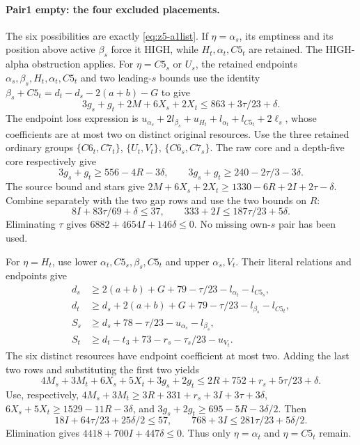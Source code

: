 \documentclass[11pt,letterpaper]{article}
\theoremstyle{definition}\newtheorem{definition}[theorem]{Definition}
\begin{document}
\paragraph{Pair1 empty: the four excluded placements.}
The six possibilities are exactly \eqref{eq:z5-a1list}.
If $\eta=\alpha_s$, its emptiness and its position above active
$\beta_s$ force it HIGH, while $H_t,\alpha_t,C5_t$ are retained.
The HIGH-alpha obstruction applies.
For $\eta=C5_s$ or $U_s$, the retained endpoints
$\alpha_s,\beta_s,H_t,\alpha_t,C5_t$ and two leading-$s$ bounds
use the identity $\beta_s+C5_t=d_t-d_s-2(a+b)-G$ to give
\[
 3g_s+g_t+2M+6X_s+2X_t\le863+3\tau/23+\delta.
\]
The endpoint loss expression is
$u_{\alpha_s}+2l_{\beta_s}+u_{H_t}+l_{\alpha_t}+l_{C5_t}+2\ell_s$,
whose coefficients are at most two on distinct original resources.
Use the three retained ordinary groups
$\{C6_t,C7_t\}$, $\{U_t,V_t\}$, $\{C6_s,C7_s\}$.
The raw core and a depth-five core respectively give
\[
 3g_s+g_t\ge556-4R-3\delta,\qquad
 3g_s+g_t\ge240-2\tau/3-3\delta.
\]
The source bound and stars give
$2M+6X_s+2X_t\ge1330-6R+2I+2\tau-\delta$.
Combine separately with the two gap rows and use the two bounds on $R$:
\[
 8I+83\tau/69+\delta\le37,\qquad
 333+2I\le187\tau/23+5\delta.
\]
Eliminating $\tau$ gives $6882+4654I+146\delta\le0$.
No missing own-$s$ pair has been used.

For $\eta=H_t$, use lower $\alpha_t,C5_s,\beta_s,C5_t$ and upper
$\alpha_s,V_t$. Their literal relations and endpoints give
\begin{align*}
 d_s&\ge2(a+b)+G+79-\tau/23-l_{\alpha_t}-l_{C5_s},\\
 d_t&\ge d_s+2(a+b)+G+79-\tau/23-l_{\beta_s}-l_{C5_t},\\
 S_s&\ge d_s+78-\tau/23-u_{\alpha_s}-l_{\beta_s},\\
 S_t&\ge d_t-t_3+73-r_s-\tau_s/23-u_{V_t}.
\end{align*}
The six distinct resources have endpoint coefficient at most two.
Adding the last two rows and substituting the first two yields
\[
 4M_s+3M_t+6X_s+5X_t+3g_s+2g_t
 \le2R+752+r_s+5\tau/23+\delta.
\]
Use, respectively,
$4M_s+3M_t\ge3R+331+r_s+3I+3\tau+3\delta$,
$6X_s+5X_t\ge1529-11R-3\delta$, and
$3g_s+2g_t\ge695-5R-3\delta/2$.
Then
\[
 18I+64\tau/23+25\delta/2\le57,\qquad
 768+3I\le281\tau/23+5\delta/2.
\]
Elimination gives $4418+700I+447\delta\le0$.
Thus only $\eta=\alpha_t$ and $\eta=C5_t$ remain.
\end{document}
